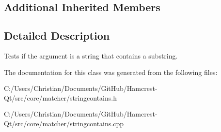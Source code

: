 \subsection*{Additional Inherited Members}


\subsection{Detailed Description}
Tests if the argument is a string that contains a substring. 

The documentation for this class was generated from the following files\-:\begin{DoxyCompactItemize}
\item 
C\-:/\-Users/\-Christian/\-Documents/\-Git\-Hub/\-Hamcrest-\/\-Qt/src/core/matcher/stringcontains.\-h\item 
C\-:/\-Users/\-Christian/\-Documents/\-Git\-Hub/\-Hamcrest-\/\-Qt/src/core/matcher/stringcontains.\-cpp\end{DoxyCompactItemize}
